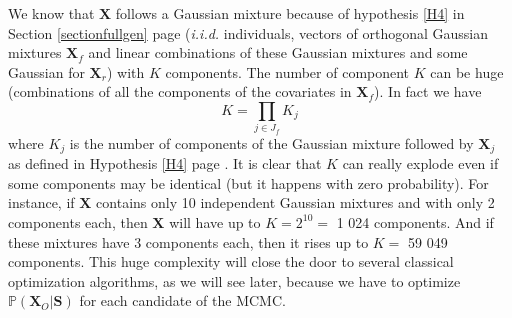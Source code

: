 \documentclass[12pt,a4paper]{report}
\begin{document}
	We know that $\boldsymbol{X}$ follows a Gaussian mixture because of hypothesis \ref{H4} in Section \ref{sectionfullgen} page \pageref{H4} ({\it i.i.d.} individuals, vectors of orthogonal Gaussian mixtures $\boldsymbol{X}_f$ and linear combinations of these Gaussian mixtures and some Gaussian for $\boldsymbol{X}_r$) with $K$ components. 
	The number of component $K$ can be huge (combinations of all the components of the covariates in $\boldsymbol{X}_f$). In fact we have 
	\begin{equation}
		K=\prod_{j\in J_f}K_j  \nonumber 
	\end{equation}
	where $K_j$ is the number of components of the Gaussian mixture followed by $\boldsymbol{X}_j$ as defined in Hypothesis \ref{H4} page \pageref{H4}. It is clear that $K$ can really explode even if some components may be identical (but it happens with zero probability). For instance, if $\boldsymbol{X}$ contains only 10 independent Gaussian mixtures and with only 2 components each, then $\boldsymbol{X}$ will have up to $K=2^{10}=$ 1 024 components. And if these mixtures have 3 components each, then it rises up to $K=$ 59 049 components. This huge complexity will close the door to several classical optimization algorithms, as we will see later, because we have to optimize $\mathbb{P}(\boldsymbol{X}_O|\boldsymbol{S})$ for each candidate of the MCMC.
%
\end{document}

